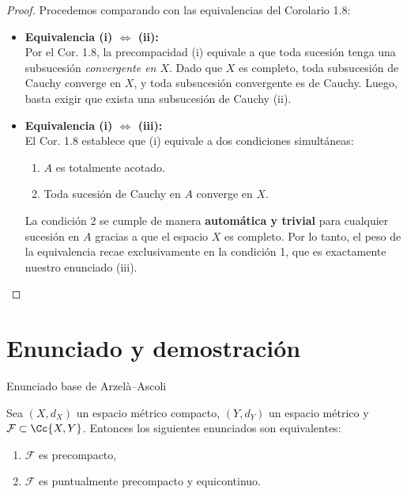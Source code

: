 \begin{frame}
    \begin{proof}
        Procedemos comparando con las equivalencias del Corolario 1.8:
        \vspace{0.2cm}
        \begin{itemize}
            \item \textbf{Equivalencia (i) $\iff$ (ii):}\\
            Por el Cor. 1.8, la precompacidad (i) equivale a que toda sucesión tenga una subsucesión \textit{convergente en $X$}. Dado que $X$ es completo, toda subsucesión de Cauchy converge en $X$, y toda subsucesión convergente es de Cauchy. Luego, basta exigir que exista una subsucesión de Cauchy (ii).
            
            \vspace{0.3cm}
            \item \textbf{Equivalencia (i) $\iff$ (iii):}\\
            El Cor. 1.8 establece que (i) equivale a dos condiciones simultáneas: 
            \begin{enumerate}
                \item[1.] $A$ es totalmente acotado.
                \item[2.] Toda sucesión de Cauchy en $A$ converge en $X$.
            \end{enumerate}
            La condición 2 se cumple de manera \textbf{automática y trivial} para cualquier sucesión en $A$ gracias a que el espacio $X$ es completo. Por lo tanto, el peso de la equivalencia recae exclusivamente en la condición 1, que es exactamente nuestro enunciado (iii).
        \end{itemize}
    \end{proof}
\end{frame}


\section{Enunciado y demostración}

\begin{frame}{Enunciado base de Arzelà--Ascoli}
    \begin{teorema}
        Sea $(X, d_X)$ un espacio métrico compacto, $(Y, d_Y)$ un espacio métrico y $\mathcal F\subset \Cc{X,Y}$. Entonces los siguientes enunciados son equivalentes:
        \begin{enumerate}
            \item $\mathcal F$ es precompacto,
            \item $\mathcal F$ es puntualmente precompacto y equicontinuo.
        \end{enumerate}
    \end{teorema}
\end{frame}



